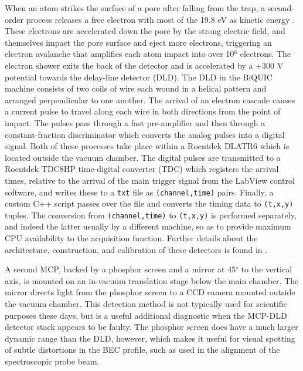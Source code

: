 	When an atom strikes the surface of a pore after falling from the trap, a second-order process releases a free electron with most of the 19.8 eV as kinetic energy \cite{Jagutzi02,Hotop96}.
	These electrons are accelerated down the pore by the strong electric field, and themselves impact the pore surface and eject more electrons, triggering an electron avalanche that amplifies each atom impact into over 10$^6$ electrons.
	The electron shower exits the back of the detector and is accelerated by a +300 V potential towards the delay-line detector (DLD).
	The DLD in the BiQUIC machine consists of two coils of wire each wound in a helical pattern and arranged perpendicular to one another.
	 The arrival of an electron cascade causes a current pulse to travel along each wire in both directions from the point of impact.
	The pulses pass through a fast pre-amplifier and then through a constant-fraction discriminator which converts the analog pulses into a digital signal.
	Both of these processes take place within a Roentdek DLATR6 which is located outside the vacuum chamber.
	The digital pulses are transmitted to a Roentdek TDC8HP time-digital converter (TDC) which registers the arrival times, relative to the arrival of the main trigger signal from the LabView control software, and writes these to a \verb|txt| file as \verb|(channel,time)| pairs.
	Finally, a custom C++ script passes over the file and converts the timing data to \verb|(t,x,y)| tuples.
	The conversion from \verb|(channel,time)| to \verb|(t,x,y)| is performed separately, and indeed the latter usually by a different machine, so as to provide maximum CPU availability to the acquisition function.	Further details about the architecture, construction, and calibration of these detectors is found in \cite{HodgmanThesis,ManningThesis}.

	A second MCP, backed by a phosphor screen and a mirror at 45$^\circ$ to the vertical axis, is mounted on an in-vacuum translation stage below the main chamber.
	The mirror directs light from the phosphor screen to a CCD camera mounted outside the vacuum chamber.
	This detection method is not typically used for scientific purposes these days, but is a useful additional diagnostic when the MCP-DLD detector stack appears to be faulty.
	The phosphor screen does have a much larger dynamic range than the DLD, however, which makes it useful for visual spotting of subtle distortions in the BEC profile, such as used in the alignment of the spectroscopic probe beam.
	


